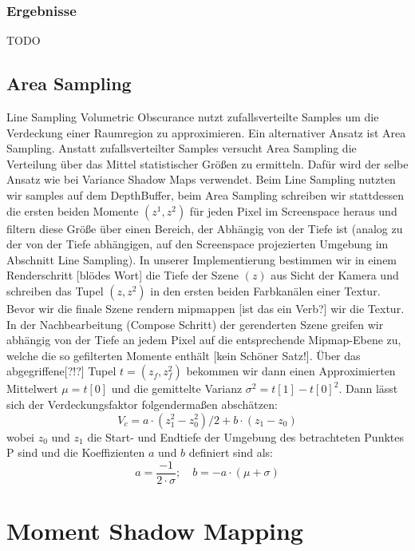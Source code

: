 \documentclass[runningheaders,a4paper]{llncs}
\begin{document}
\subsubsection{Ergebnisse}
TODO

\subsection{Area Sampling}
Line Sampling Volumetric Obscurance nutzt zufallsverteilte Samples um die Verdeckung einer
Raumregion zu approximieren. Ein alternativer Ansatz ist Area Sampling. Anstatt zufallsverteilter Samples
versucht Area Sampling die Verteilung über das Mittel statistischer Größen zu ermitteln. Dafür
wird der selbe Ansatz wie bei Variance Shadow Maps \cite{vsmPaper} verwendet. Beim Line Sampling
nutzten wir samples auf dem DepthBuffer, beim Area Sampling schreiben wir stattdessen die ersten beiden
Momente $(z^1, z^2)$ für jeden Pixel im Screenspace heraus und filtern diese Größe über einen Bereich, der
Abhängig von der Tiefe ist (analog zu der von der Tiefe abhängigen, auf den Screenspace projezierten Umgebung
im Abschnitt Line Sampling). In unserer Implementierung bestimmen wir in einem Renderschritt [blödes Wort]
die Tiefe der Szene $(z)$ aus Sicht der Kamera und schreiben das Tupel $(z, z^2)$ in den ersten beiden
Farbkanälen einer Textur. Bevor wir die finale Szene rendern mipmappen [ist das ein Verb?] wir die Textur.
In der Nachbearbeitung (Compose Schritt) der gerenderten Szene greifen wir abhängig von der Tiefe an jedem
Pixel auf die entsprechende Mipmap-Ebene zu, welche die so gefilterten Momente enthält [kein Schöner Satz!].
Über das abgegriffene[?!?] Tupel $t = (z_f, z_f^2)$ bekommen wir dann einen Approximierten Mittelwert 
$\mu = t[0]$ und die gemittelte Varianz $\sigma^2 = t[1] - t[0]^2$. Dann lässt sich der Verdeckungsfaktor 
folgendermaßen abschätzen:
$$
V_c = a\cdot(z_1^2 - z_0^2) / 2 + b \cdot (z_1 - z_0)
$$
wobei $z_0$ und $z_1$ die Start- und Endtiefe der Umgebung des betrachteten Punktes P sind und die 
Koeffizienten $a$ und $b$ definiert sind als:
$$
a = \frac{-1}{2 \cdot \sigma}; \quad b = -a \cdot (\mu + \sigma)
$$


\section{Moment Shadow Mapping}
\end{document}
